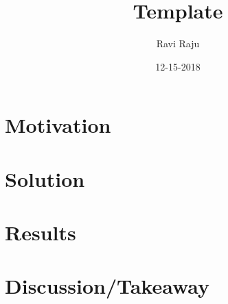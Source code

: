 \documentclass{article}
\title{Template}
\date{12-15-2018}
\author{Ravi Raju}
\begin{document}
\maketitle
{}
{}
\section{Motivation}

\section{Solution}

\section{Results}

\section{Discussion/Takeaway}
\end{document}
